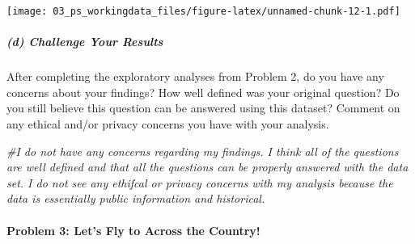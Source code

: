 \documentclass[
]{article}
\newenvironment{Shaded}{\begin{snugshade}}{\end{snugshade}}
\newcommand{\AttributeTok}[1]{\textcolor[rgb]{0.77,0.63,0.00}{#1}}
\newcommand{\CommentTok}[1]{\textcolor[rgb]{0.56,0.35,0.01}{\textit{#1}}}
\newcommand{\ConstantTok}[1]{\textcolor[rgb]{0.00,0.00,0.00}{#1}}
\newcommand{\FunctionTok}[1]{\textcolor[rgb]{0.00,0.00,0.00}{#1}}
\newcommand{\NormalTok}[1]{#1}
\newcommand{\OtherTok}[1]{\textcolor[rgb]{0.56,0.35,0.01}{#1}}
\newcommand{\SpecialCharTok}[1]{\textcolor[rgb]{0.00,0.00,0.00}{#1}}
\newcommand{\StringTok}[1]{\textcolor[rgb]{0.31,0.60,0.02}{#1}}
\begin{document}
\begin{Shaded}
\end{Shaded}

\texttt{[image: 03\_ps\_workingdata\_files/figure-latex/unnamed-chunk-12-1.pdf]}

\hypertarget{d-challenge-your-results}{%
\subparagraph{(d) Challenge Your
Results}\label{d-challenge-your-results}}

After completing the exploratory analyses from Problem 2, do you have
any concerns about your findings? How well defined was your original
question? Do you still believe this question can be answered using this
dataset? Comment on any ethical and/or privacy concerns you have with
your analysis.

\begin{Shaded}
\begin{Highlighting}[]
\CommentTok{\#I do not have any concerns regarding my findings. I think all of the questions are well defined and that all the questions can be properly answered with the data set. I do not see any ethifcal or privacy concerns with my analysis because the data is essentially public information and historical. }
\end{Highlighting}
\end{Shaded}

\hypertarget{problem-3-lets-fly-to-across-the-country}{%
\paragraph{Problem 3: Let's Fly to Across the
Country!}\label{problem-3-lets-fly-to-across-the-country}}
\end{document}
